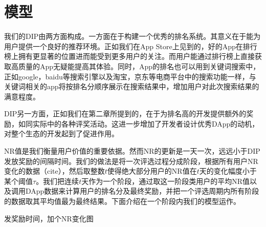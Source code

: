 \section{模型}
我们的DIP由两方面构成。一方面在于构建一个优秀的排名系统。其意义在于能为用户提供一个良好的推荐环境。正如我们在App Store上见到的，好的App在排行榜上拥有更显著的位置进而能受到更多用户的关注。而用户能通过排行榜上直接获取高质量的App无疑能提高其体验。同时，App的排名也可以用到关键词搜索中，正如google，baidu等搜索引擎以及淘宝，京东等电商平台中的搜索功能一样，与关键词相关的app将按排名分顺序展示在搜索结果中，增加用户对此次搜索结果的满意程度。

DIP另一方面，正如我们在第二章所提到的，在于为排名高的开发提供额外的奖励，如同实际中的各种评奖活动。这进一步增加了开发者设计优秀DApp的动机，对整个生态的开发起到了促进作用。

NR值是我们衡量用户价值的重要依据。然而NR的更新是一天一次，远远小于DIP发放奖励的间隔时间。我们的做法是将一次评选过程分成阶段，根据所有用户NR变化的数据（cite），然后取整数$t$使得绝大部分用户的NR值在$t$天的变化幅度小于某个阈值$\tau$。我们把连续$t$天作为一个阶段，通过取这一阶段类用户的平均NR值以及调用DApp数据来计算用户的排名分及最终奖励，并把一个评选周期内所有阶段的数据取其平均值最为最终结果。下面介绍在一个阶段内我们的模型运作。


{\color{red} 发奖励时间，加个NR变化图}

